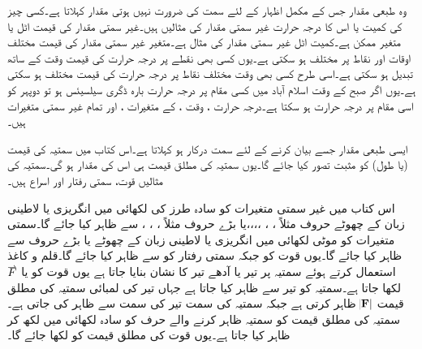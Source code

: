 وہ طبعی مقدار جس کے مکمل اظہار کے لئے سمت کی ضرورت نہیں ہوتی  مقدار کہلاتا ہے۔کسی چیز کی کمیت  یا اس کا درجہ حرارت  غیر سمتی مقدار کی مثالیں ہیں۔غیر سمتی مقدار کی قیمت اٹل یا متغیر ممکن ہے۔کمیت اٹل غیر سمتی مقدار کی مثال ہے۔متغیر غیر سمتی مقدار کی قیمت مختلف اوقات اور نقاط پر مختلف ہو سکتی ہے۔یوں کسی بھی نقطے پر درجہ حرارت کی قیمت وقت  کے ساتھ تبدیل ہو سکتی ہے۔اسی طرح کسی بھی وقت مختلف نقاط پر درجہ حرارت کی قیمت مختلف ہو سکتی ہے۔یوں اگر صبح  کے وقت اسلام آباد میں کسی مقام پر درجہ حرارت بارہ ڈگری سیلسیئس  ہو تو دوپہر کو اسی مقام پر درجہ حرارت  ہو سکتا ہے۔درجہ حرارت ، وقت ،   کے متغیرات  ،  اور  تمام غیر سمتی متغیرات ہیں۔

ایسی طبعی مقدار جسے بیان کرنے کے لئے سمت درکار ہو  کہلاتا ہے۔اس کتاب میں سمتیہ کی قیمت (یا طول) کو مثبت تصور کیا جائے گا۔یوں سمتیہ کی مطلق قیمت ہی اس کی مقدار ہو گی۔سمتیہ کی مثالیں قوت، سمتی رفتار اور اسراع  ہیں۔

اس کتاب میں غیر سمتی متغیرات کو سادہ طرز کی لکھائی میں انگریزی یا لاطینی زبان کے  چھوٹے حروف مثلاً ، ، ،،،،   یا بڑے حروف مثلاً ، ، ،   سے ظاہر کیا جائے گا۔سمتی متغیرات کو موٹی لکھائی میں انگریزی یا لاطینی زبان کے  چھوٹے  یا بڑے حروف  سے ظاہر کیا جائے گا۔یوں قوت  کو  جبکہ سمتی رفتار کو  سے ظاہر کیا جائے گا۔قلم و کاغذ استعمال کرتے ہوئے سمتیہ پر تیر  یا آدھے تیر کا نشان بنایا جاتا ہے یوں قوت کو  یا  
$\overset{\rightharpoonup}{\rule{0pt}{.9ex}\smash{F}}$
لکھا جاتا ہے۔سمتیہ کو تیر سے ظاہر کیا جاتا ہے جہاں تیر کی لمبائی سمتیہ کی مطلق قیمت $\abs{\bf{F}}$  ظاہر کرتی ہے جبکہ سمتیہ کی سمت تیر کی سمت  سے ظاہر کی جاتی ہے۔سمتیہ کی مطلق قیمت کو سمتیہ ظاہر کرنے والے حرف کو سادہ لکھائی میں لکھ کر ظاہر کیا جاتا ہے۔یوں قوت   کی مطلق قیمت  کو  لکھا جائے گا۔ 

